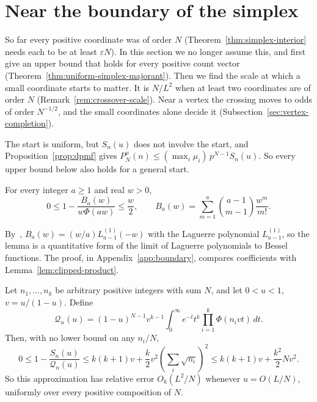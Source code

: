 \section{Near the boundary of the simplex}
\label{sec:frontier-boundary}

So far every positive coordinate was of order $N$
(Theorem~\ref{thm:simplex-interior} needs each to be at least $\varepsilon N$).
In this section we no longer assume this, and first give an upper bound that
holds for every positive count vector (Theorem~\ref{thm:uniform-simplex-majorant}).
Then we find the scale at which a small coordinate starts to matter. It is
$N/L^2$ when at least two coordinates are of order $N$
(Remark~\ref{rem:crossover-scale}). Near a vertex the crossing moves to odds of
order $N^{-1/2}$, and the small coordinates alone decide it
(Subsection~\ref{sec:vertex-completion}).

The start is uniform, but $S_n(u)$ does not involve the start, and
Proposition~\ref{prop:dpmf} gives $P^\mu_N(n)\le(\max_i\mu_i)\,p^{N-1}S_n(u)$.
So every upper bound below also holds for a general start.

\begin{lemma}
\label{lem:uniform-laguerre-bessel}
For every integer $a\ge1$ and real $w>0$,
\begin{equation}\label{eq:uniform-laguerre-bessel}
0\le1-\frac{B_a(w)}{w\Phi(aw)}\le\frac w2,
\qquad
B_a(w)=\sum_{m=1}^{a}\binom{a-1}{m-1}\frac{w^m}{m!}.
\end{equation}
\end{lemma}

By~\cite[Eq.~18.5.12]{dlmf}, $B_a(w)=(w/a)L^{(1)}_{a-1}(-w)$ with the Laguerre
polynomial $L^{(1)}_{a-1}$, so the lemma is a quantitative form of the limit of
Laguerre polynomials to Bessel functions. The proof, in
Appendix~\ref{app:boundary}, compares coefficients with
Lemma~\ref{lem:clipped-product}.

\begin{theorem}
\label{thm:uniform-simplex-majorant}
Let $n_1,\ldots,n_k$ be arbitrary positive integers with sum $N$, and let
$0<u<1$, $v=u/(1-u)$. Define
\[
\mathcal Q_n(u)=(1-u)^{N-1}v^{k-1}
\int_0^\infty e^{-t}t^k\prod_{i=1}^k\Phi(n_i vt)\,dt.
\]
Then, with no lower bound on any $n_i/N$,
\begin{equation}\label{eq:uniform-simplex-majorant}
0\le1-\frac{S_n(u)}{\mathcal Q_n(u)}
\le k(k+1)v+\frac{k}{2}v^2\left(\sum_i\sqrt{n_i}\right)^2
\le k(k+1)v+\frac{k^2}{2}Nv^2.
\end{equation}
So this approximation has relative error $O_k(L^2/N)$ whenever
$u=O(L/N)$, uniformly over every positive composition of $N$.
\end{theorem}

